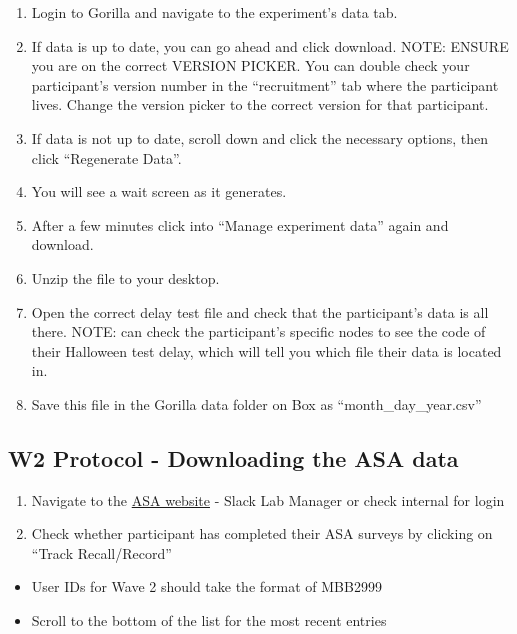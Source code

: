\documentclass[]{book}
\providecommand{\tightlist}{%
  \setlength{\itemsep}{0pt}\setlength{\parskip}{0pt}}
\begin{document}
\begin{enumerate}
\def\labelenumi{\arabic{enumi}.}
\item
  Login to Gorilla and navigate to the experiment's data tab.
\item
  If data is up to date, you can go ahead and click download. NOTE: ENSURE you are on the correct VERSION PICKER. You can double check your participant's version number in the ``recruitment'' tab where the participant lives. Change the version picker to the correct version for that participant.
\item
  If data is not up to date, scroll down and click the necessary options, then click ``Regenerate Data''.
\item
  You will see a wait screen as it generates.
\item
  After a few minutes click into ``Manage experiment data'' again and download.
\item
  Unzip the file to your desktop.
\item
  Open the correct delay test file and check that the participant's data is all there. NOTE: can check the participant's specific nodes to see the code of their Halloween test delay, which will tell you which file their data is located in.
\item
  Save this file in the Gorilla data folder on Box as ``month\_day\_year.csv''
\end{enumerate}

\hypertarget{w2-protocol---downloading-the-asa-data}{%
\subsection{W2 Protocol - Downloading the ASA data}\label{w2-protocol---downloading-the-asa-data}}

\begin{enumerate}
\def\labelenumi{\arabic{enumi}.}
\tightlist
\item
  Navigate to the \href{https://asa24.nci.nih.gov}{ASA website} - Slack Lab Manager or check internal for login
\item
  Check whether participant has completed their ASA surveys by clicking on ``Track Recall/Record''
\end{enumerate}

\begin{itemize}
\tightlist
\item
  User IDs for Wave 2 should take the format of MBB2999
\item
  Scroll to the bottom of the list for the most recent entries
\end{itemize}
\end{document}
